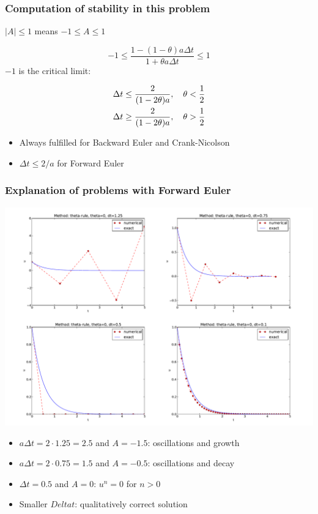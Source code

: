 \documentclass{beamer}
\begin{document}
\begin{frame}
\frametitle{Computation of stability in this problem}

$|A|\leq 1$ means $-1\leq A\leq 1$

\begin{equation}
-1\leq\frac{1 - (1-\theta) a\Delta t}{1 + \theta a\Delta t} \leq 1
\label{decay:th:stability}
\end{equation}
$-1$ is the critical limit:

\begin{align*}
\Delta t &\leq \frac{2}{(1-2\theta)a},\quad \theta < \half\\ 
\Delta t &\geq \frac{2}{(1-2\theta)a},\quad \theta > {\half}
\end{align*}

\begin{itemize}
 \item Always fulfilled for Backward Euler and Crank-Nicolson

 \item $\Delta t \leq 2/a$ for Forward Euler
\end{itemize}

\noindent
\end{frame}

\begin{frame}
\frametitle{Explanation of problems with Forward Euler}

\centerline{\includegraphics[width=1.1\linewidth]{fig-analysis/FE4c.pdf}}



\begin{itemize}
 \item $a\Delta t= 2\cdot 1.25=2.5$ and $A=-1.5$: oscillations and growth

 \item $a\Delta t = 2\cdot 0.75=1.5$ and $A=-0.5$: oscillations and decay

 \item $\Delta t=0.5$ and $A=0$: $u^n=0$ for $n>0$

 \item Smaller $Delta t$: qualitatively correct solution
\end{itemize}

\noindent
\end{frame}
\end{document}
